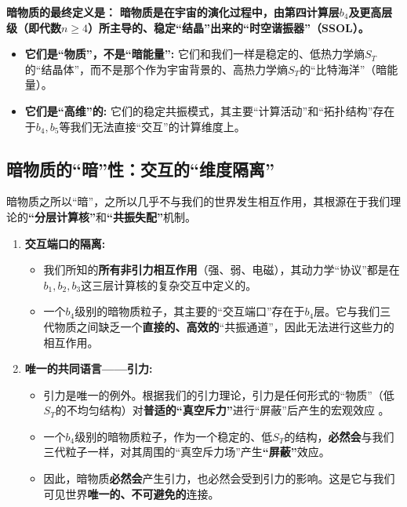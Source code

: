 \documentclass[11pt, a4paper]{article}
\begin{document}
\textbf{暗物质的最终定义是：}
\textbf{暗物质是在宇宙的演化过程中，由第四计算层$b_4$及更高层级（即代数$n \ge 4$）所主导的、稳定“结晶”出来的“时空谐振器”（SSOL）。}

\begin{itemize}
    \item \textbf{它们是“物质”，不是“暗能量”:} 它们和我们一样是稳定的、低热力学熵$S_T$的“结晶体”，而不是那个作为宇宙背景的、高热力学熵$S_T$的“比特海洋”（暗能量）。
    \item \textbf{它们是“高维”的:} 它们的稳定共振模式，其主要“计算活动”和“拓扑结构”存在于$b_4, b_5$等我们无法直接“交互”的计算维度上。
\end{itemize}

\subsection{暗物质的“暗”性：交互的“维度隔离”}
暗物质之所以“暗”，之所以几乎不与我们的世界发生相互作用，其根源在于我们理论的\textbf{“分层计算核”}和\textbf{“共振失配”}机制。

\begin{enumerate}
    \item \textbf{交互端口的隔离:}
    \begin{itemize}
        \item 我们所知的\textbf{所有非引力相互作用}（强、弱、电磁），其动力学“协议”都是在$b_1, b_2, b_3$这三层计算核的复杂交互中定义的。
        \item 一个$b_4$级别的暗物质粒子，其主要的“交互端口”存在于$b_4$层。它与我们三代物质之间缺乏一个\textbf{直接的、高效的}“共振通道”，因此无法进行这些力的相互作用。
    \end{itemize}

    \item \textbf{唯一的共同语言——引力:}
    \begin{itemize}
        \item 引力是唯一的例外。根据我们的引力理论，引力是任何形式的“物质”（低$S_T$的不均匀结构）对\textbf{普适的“真空斥力”}进行“屏蔽”后产生的宏观效应 \cite{Newton1687}。
        \item 一个$b_4$级别的暗物质粒子，作为一个稳定的、低$S_T$的结构，\textbf{必然会}与我们三代粒子一样，对其周围的“真空斥力场”产生\textbf{“屏蔽”}效应。
        \item 因此，暗物质\textbf{必然会}产生引力，也必然会受到引力的影响。这是它与我们可见世界\textbf{唯一的、不可避免的}连接。
    \end{itemize}
\end{enumerate}
\end{document}
